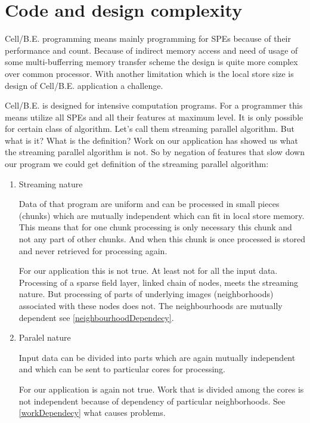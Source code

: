 \section{Code and design complexity}

\par
Cell/B.E. programming means mainly programming for SPEs because of their performance and count.
Because of indirect memory access and need of usage of some multi-bufferring memory transfer scheme the design is quite more complex over common processor.
With another limitation which is the local store size is design of Cell/B.E. application a challenge.

\par
Cell/B.E. is designed for intensive computation programs.
For a programmer this means utilize all SPEs and all their features at maximum level.
It is only possible for certain class of algorithm.
Let's call them streaming parallel algorithm.
But what is it? What is the definition?
Work on our application has showed us what the streaming parallel algorithm is not.
So by negation of features that slow down our program we could get definition of the streaming parallel algorithm:
\begin{enumerate}

\item{Streaming nature}
\par
Data of that program are uniform and can be processed in small pieces (chunks) which are mutually independent which can fit in local store memory.
This means that for one chunk processing is only necessary this chunk and not any part of other chunks.
And when this chunk is once processed is stored and never retrieved for processing again.

\par
For our application this is not true.
At least not for all the input data.
Processing of a sparse field layer, linked chain of nodes, meets the streaming nature.
But processing of parts of underlying images (neighborhoods) associated with these nodes does not.
The neighbourhoods are mutually dependent see \ref{neighbourhoodDependecy}.

\item{Paralel nature}
\par
Input data can be divided into parts which are again mutually independent and which can be sent to particular cores for processing.

\par
For our application is again not true.
Work that is divided among the cores is not independent because of dependency of particular neighborhoods.
See \ref{workDependecy} what causes problems.

\end{enumerate}

